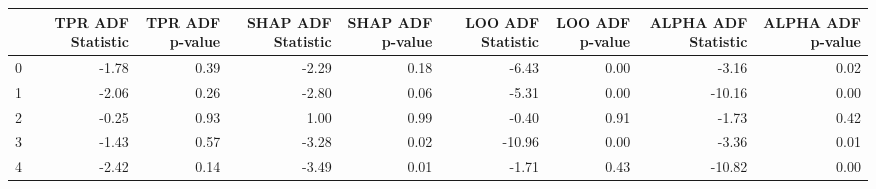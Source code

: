 \begin{tabular}{lrrrrrrrr}
\toprule
 & TPR ADF Statistic & TPR ADF p-value & SHAP ADF Statistic & SHAP ADF p-value & LOO ADF Statistic & LOO ADF p-value & ALPHA ADF Statistic & ALPHA ADF p-value \\
\midrule
0 & -1.78 & 0.39 & -2.29 & 0.18 & -6.43 & 0.00 & -3.16 & 0.02 \\
1 & -2.06 & 0.26 & -2.80 & 0.06 & -5.31 & 0.00 & -10.16 & 0.00 \\
2 & -0.25 & 0.93 & 1.00 & 0.99 & -0.40 & 0.91 & -1.73 & 0.42 \\
3 & -1.43 & 0.57 & -3.28 & 0.02 & -10.96 & 0.00 & -3.36 & 0.01 \\
4 & -2.42 & 0.14 & -3.49 & 0.01 & -1.71 & 0.43 & -10.82 & 0.00 \\
\bottomrule
\end{tabular}
